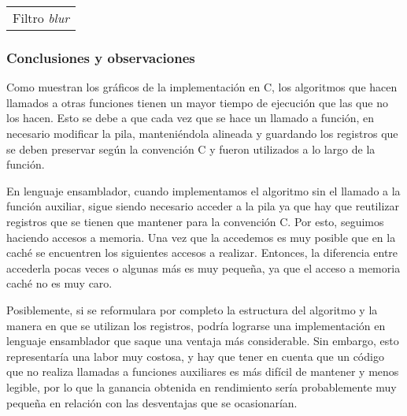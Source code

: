 				{\centering \begin{tabular}{c}
		      		{\small Filtro \emph{blur}} \\
		    	\end{tabular}}

			\subsubsection*{Conclusiones y observaciones}		

				Como muestran los gráficos de la implementación en C, los algoritmos que hacen llamados a otras funciones tienen un mayor tiempo de ejecución que las que no los hacen. Esto se debe a que cada vez que se hace un llamado a función, en necesario modificar la pila, manteniéndola alineada y guardando los registros que se deben preservar según la convención C y fueron utilizados a lo largo de la función.

				En lenguaje ensamblador, cuando implementamos el algoritmo sin el llamado a la función auxiliar, sigue siendo necesario acceder a la pila ya que hay que reutilizar registros que se tienen que mantener para la convención C. Por esto, seguimos haciendo accesos a memoria. Una vez que la accedemos es muy posible que en la caché se encuentren los siguientes accesos a realizar. Entonces, la diferencia entre accederla pocas veces o algunas más es muy pequeña, ya que el acceso a memoria caché no es muy caro.

				Posiblemente, si se reformulara por completo la estructura del algoritmo y la manera en que se utilizan los registros, podría lograrse una implementación en lenguaje ensamblador que saque una ventaja más considerable. Sin embargo, esto representaría una labor muy costosa, y hay que tener en cuenta que un código que no realiza llamadas a funciones auxiliares es más difícil de mantener y menos legible, por lo que la ganancia obtenida en rendimiento sería probablemente muy pequeña en relación con las desventajas que se ocasionarían.
